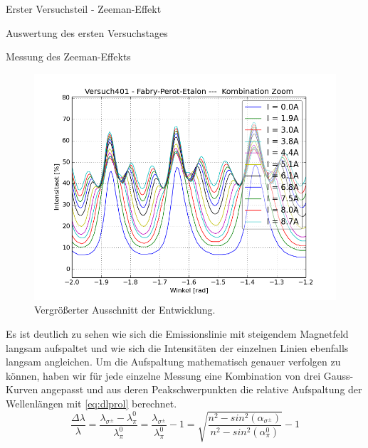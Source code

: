 \documentclass[pdftex, a4paper,11pt, twoside, ngerman]{report}
\begin{document}
\begin{chapter}{Erster Versuchsteil - Zeeman-Effekt}
\begin{section}{Auswertung des ersten Versuchstages}
\begin{subsection}{Messung des Zeeman-Effekts}
\begin{figure}[ht]
\begin{minipage}{0.48\textwidth}
            \includegraphics[width=\textwidth]
                {Figures/Versuch401-Fabry-Perot-Etalon-KombinationZoom_Winkel_Intensitaet.png}
                \caption{Vergrößerter Ausschnitt der Entwicklung.}
            \label{fig:FPEcombiZOOM}
          \end{minipage}
        \end{figure}
        \newline
        Es ist deutlich zu sehen wie sich die Emissionslinie mit steigendem
        Magnetfeld langsam aufspaltet und wie sich die Intensitäten der
        einzelnen Linien ebenfalls langsam angleichen. Um die Aufspaltung
        mathematisch genauer verfolgen zu können, haben wir für jede einzelne
        Messung eine Kombination von drei Gauss-Kurven angepasst und aus deren
        Peakschwerpunkten die relative Aufspaltung der Wellenlängen mit
        \cref{eq:dlprol} berechnet.
        \begin{equation}
          \label{eq:dlprol}
          \frac{\Delta\lambda}{\lambda} = \frac{\lambda_{\sigma^{\pm}}-
          \lambda_{\pi}^{0}}{\lambda_{\pi}^{0}} = \frac{\lambda_{\sigma^{\pm}}} 
          {\lambda_{\pi}^{0}}-1 = \sqrt{\frac{n^{2}-sin^{2}
          (\alpha_{\sigma^{\pm}})}{n^{2}-sin^{2}
          (\alpha_{\pi}^{0})}}-1
        \end{equation}
        \begin{figure}[b!]
          \centering
          \begin{minipage}{0.48\textwidth}
            \centering

\end{minipage}
\end{figure}
\end{subsection}
\end{section}
\end{chapter}
\end{document}
